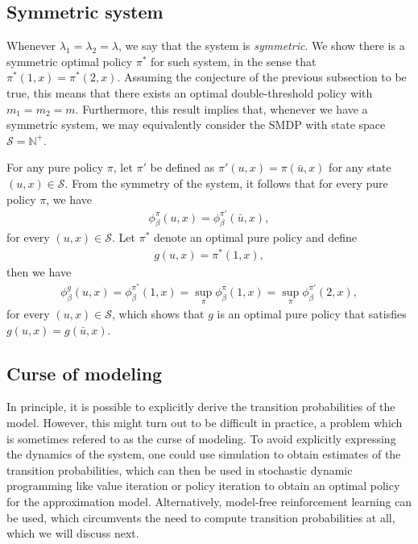 \documentclass{article}
\theoremstyle{definition}
\theoremstyle{plain}
\begin{document}
\subsection{Symmetric system}
\label{sec:symmetric_system}

Whenever $\lambda_{1} = \lambda_{2} = \lambda$, we say that the system is
\textit{symmetric}. We show there is a symmetric optimal policy $\pi^{*}$ for
such system, in the sense that $\pi^{*}(1,x) = \pi^{*}(2,x)$. Assuming the
conjecture of the previous subsection to be true, this means that there exists
an optimal double-threshold policy with $m_{1} = m_{2} = m$. Furthermore, this
result implies that, whenever we have a symmetric system, we may equivalently
consider the SMDP with state space $\mathcal{S} = \mathbb{N}^{+}$.

For any pure policy $\pi$, let $\pi'$ be defined as
$\pi'(u, x) = \pi(\bar{u}, x)$ for any state $(u, x) \in \mathcal{S}$. From the
symmetry of the system, it follows that for every pure policy $\pi$, we have
\begin{align}
  \phi_{\beta}^{\pi}(u, x) = \phi_{\beta}^{\pi'}(\bar{u}, x) ,
\end{align}
for every $(u, x) \in \mathcal{S}$. Let $\pi^{*}$ denote an optimal pure policy
and define
\begin{align}
g(u, x) = \pi^{*}(1, x) ,
\end{align}
then we have
\begin{align}
  \phi_{\beta}^{g}(u, x) = \phi_{\beta}^{\pi^{*}}(1, x) = \sup_{\pi} \phi_{\beta}^{\pi} (1, x) = \sup_{\pi} \phi_{\beta}^{\pi'} (2, x) ,
\end{align}
for every $(u, x) \in \mathcal{S}$, which shows that $g$ is an optimal pure
policy that satisfies $g(u, x) = g(\bar{u}, x)$.



\subsection{Curse of modeling}

In principle, it is possible to explicitly derive the transition probabilities
of the model. However, this might turn out to be difficult in practice, a
problem which is sometimes refered to as the curse of modeling. To avoid
explicitly expressing the dynamics of the system, one could use simulation to
obtain estimates of the transition probabilities, which can then be used in
stochastic dynamic programming like value iteration or policy iteration to
obtain an optimal policy for the approximation model.
%
Alternatively, model-free reinforcement learning can be used, which circumvents
the need to compute transition probabilities at all, which we will discuss next.
\end{document}
